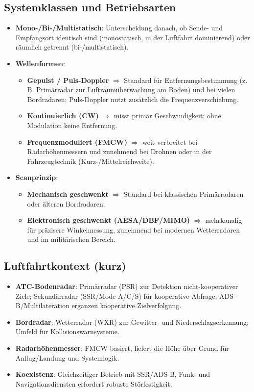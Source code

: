 \subsection{Systemklassen und Betriebsarten}
\begin{itemize}
  \item \textbf{Mono-/Bi-/Multistatisch}: Unterscheidung danach, ob Sende- und Empfangsort identisch sind
        (monostatisch, in der Luftfahrt dominierend) oder räumlich getrennt (bi-/multistatisch).
  \item \textbf{Wellenformen}:
    \begin{itemize}
      \item \textbf{Gepulst / Puls-Doppler} $\Rightarrow$ Standard für Entfernungsbestimmung (z.\,B. Primärradar zur Luftraumüberwachung am Boden)
            und bei vielen Bordradaren; Puls-Doppler nutzt zusätzlich die Frequenzverschiebung.
      \item \textbf{Kontinuierlich (CW)} $\Rightarrow$ misst primär Geschwindigkeit; ohne Modulation keine Entfernung.
      \item \textbf{Frequenzmoduliert (FMCW)} $\Rightarrow$ weit verbreitet bei Radarhöhenmessern und zunehmend bei Drohnen
            oder in der Fahrzeugtechnik (Kurz-/Mittelreichweite).
    \end{itemize}
  \item \textbf{Scanprinzip}:
    \begin{itemize}
      \item \textbf{Mechanisch geschwenkt} $\Rightarrow$ Standard bei klassischen Primärradaren oder älteren Bordradaren.
      \item \textbf{Elektronisch geschwenkt (AESA/DBF/MIMO)} $\Rightarrow$ mehrkanalig für präzisere Winkelmessung,
            zunehmend bei modernen Wetterradaren und im militärischen Bereich.
    \end{itemize}
\end{itemize}

\subsection{Luftfahrtkontext (kurz)}
\begin{itemize}
  \item \textbf{ATC-Bodenradar}: Primärradar (PSR) zur Detektion nicht-kooperativer Ziele;
        Sekundärradar (SSR/Mode A/C/S) für kooperative Abfrage; ADS-B/Multilateration ergänzen kooperative Zielverfolgung.
  \item \textbf{Bordradar}: Wetterradar (WXR) zur Gewitter- und Niederschlagserkennung; Umfeld für Kollisionswarnsysteme.
  \item \textbf{Radarhöhenmesser}: FMCW-basiert, liefert die Höhe über Grund für Anflug/Landung und Systemlogik.
  \item \textbf{Koexistenz}: Gleichzeitiger Betrieb mit SSR/ADS-B, Funk- und Navigationsdiensten erfordert robuste Störfestigkeit.
\end{itemize}

